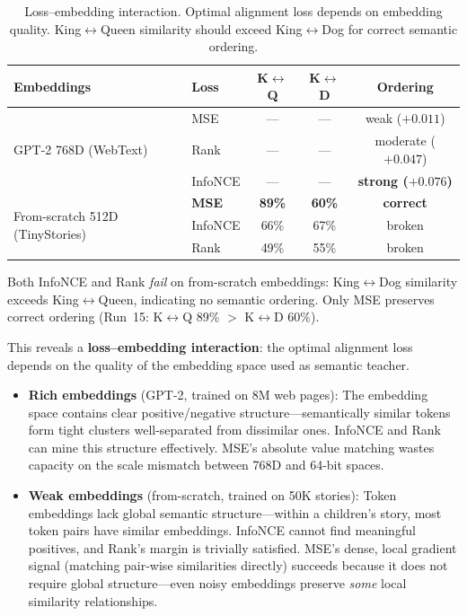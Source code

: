\documentclass[11pt,a4paper]{article}
\begin{document}
\begin{table}[h]
\centering
\caption{Loss--embedding interaction. Optimal alignment loss depends on embedding quality. King$\leftrightarrow$Queen similarity should exceed King$\leftrightarrow$Dog for correct semantic ordering.}
\label{tab:interaction}
\begin{tabular}{llccc}
\toprule
Embeddings & Loss & K$\leftrightarrow$Q & K$\leftrightarrow$D & Ordering \\
\midrule
\multirow{3}{*}{GPT-2 768D (WebText)}
    & MSE    & ---    & ---    & weak ($+0.011$) \\
    & Rank   & ---    & ---    & moderate ($+0.047$) \\
    & InfoNCE & ---   & ---    & \textbf{strong ($+0.076$)} \\
\midrule
\multirow{3}{*}{From-scratch 512D (TinyStories)}
    & \textbf{MSE} & \textbf{89\%} & \textbf{60\%} & \textbf{correct} \\
    & InfoNCE & 66\% & 67\% & broken \\
    & Rank    & 49\% & 55\% & broken \\
\bottomrule
\end{tabular}
\end{table}

Both InfoNCE and Rank \emph{fail} on from-scratch embeddings: King$\leftrightarrow$Dog similarity exceeds King$\leftrightarrow$Queen, indicating no semantic ordering. Only MSE preserves correct ordering (Run~15: K$\leftrightarrow$Q 89\% $>$ K$\leftrightarrow$D 60\%).

This reveals a \textbf{loss--embedding interaction}: the optimal alignment loss depends on the quality of the embedding space used as semantic teacher.

\begin{itemize}
    \item \textbf{Rich embeddings} (GPT-2, trained on 8M web pages): The embedding space contains clear positive/negative structure---semantically similar tokens form tight clusters well-separated from dissimilar ones. InfoNCE and Rank can mine this structure effectively. MSE's absolute value matching wastes capacity on the scale mismatch between 768D and 64-bit spaces.

    \item \textbf{Weak embeddings} (from-scratch, trained on 50K stories): Token embeddings lack global semantic structure---within a children's story, most token pairs have similar embeddings. InfoNCE cannot find meaningful positives, and Rank's margin is trivially satisfied. MSE's dense, local gradient signal (matching pair-wise similarities directly) succeeds because it does not require global structure---even noisy embeddings preserve \emph{some} local similarity relationships.
\end{itemize}
\end{document}
